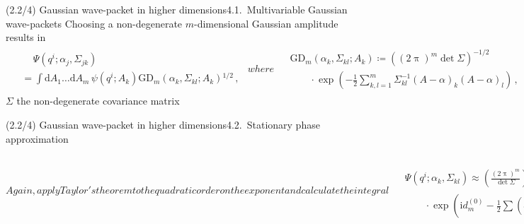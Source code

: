 \documentclass[mathserif]{beamer}
\newcommand{\rbr}[1]{{\left(#1\right)}}
\newcommand{\rfun}[2]{#1\mathopen{}\left(#2\right)\mathclose{}}
\newcommand{\dif}{\mathrm{d}}
\newcommand\mi{\mathrm{i}} %
\newcommand{\Alpha}{A}
\begin{document}
\begin{frame}{(2.2/4) Gaussian wave-packet in higher dimensions}{4.1.\ Multivariable Gaussian wave-packets}
Choosing a non-degenerate $m$-dimensional Gaussian amplitude results in
\begin{subequations}
\begin{align}
    \begin{split}
    &\quad\,\rfun{\varPsi}{q^i; \alpha_j, \Sigma_{jk}}
    \\
    &=
    \int \dif \Alpha_1\ldots \dif \Alpha_{m}\,
    \rfun{\psi}{q^i; \Alpha_k}
    \rfun{\mathrm{GD}_m}{\alpha_k, \varSigma_{kl}; \Alpha_k}^{1/2}\,,    
    \end{split}
\end{align}
where
\begin{align}
    \begin{split}
    &\rfun{\mathrm{GD}_m}{\alpha_k, \varSigma_{kl}; \Alpha_k} 
    \coloneqq
    \rbr{\rbr{2\uppi}^{m} \det \varSigma}^{-1/2}
    \\
    &\qquad \cdot \rfun{\exp}{-\frac{1}{2} \sum_{k,l=1}^{m} \varSigma^{-1}_{kl} \rbr{\Alpha-\alpha}_k \rbr{\Alpha-\alpha}_l}\,,
    \end{split}
    \label{eq:packet-gaussian-100}
\end{align}
\end{subequations}
$\varSigma$ the non-degenerate covariance matrix
\end{frame}

\begin{frame}{(2.2/4) Gaussian wave-packet in higher dimensions}{4.2.\ Stationary phase approximation}
\begin{subequations}
Again, apply Taylor's theorem to the quadratic order on the exponent and calculate the integral
\begin{align}
    \begin{split}
    &\rfun{\varPsi}{q^i; \alpha_k, \varSigma_{kl}}
    \approx
    \rbr{\tfrac{\rbr{2\uppi}^{m}}{\det \varSigma}}^{1/4} \rbr{\tfrac{D}{\det d^{(2)}_m}}^{1/2}
    \\
    &\qquad\cdot
    \rfun{\exp}{\mi d^{(0)}_m - \frac{1}{2} \sum\rbr{d^{(2)}_m}^{-1}_{kl} \rbr{d^{(1)}_m}_{k} \rbr{d^{(1)}_m}_{l}}\,,
    \end{split}
\end{align}
\begin{align}
    \begin{split}
    d^{(0)}_m &\coloneqq \frac{1}{\hslash}\rbr{\rfun{S}{q^i; \alpha^k} - \sum \alpha_k \beta_k}\,,
    \\
    \rbr{d^{(1)}_m}_{k} &\coloneqq \tfrac{1}{\hslash}\rbr{\partial_{\alpha_k} S - \beta_k}\,,
    \\
    \rbr{d^{(2)}_m}_{kl} &\coloneqq \rbr{\tfrac{1}{2} \varSigma^{-1} - \tfrac{\mi}{\hslash}\mathrm{Hess}_{\alpha}\, S}_{kl}\,;
    \end{split}
    \\
    \rbr{\mathrm{Hess}_{\alpha}\, S}_{kl} &\coloneqq \partial_{\alpha_k}\,\partial_{\alpha_l}S\,.
\end{align}
\end{subequations}
\end{frame}
\end{document}
